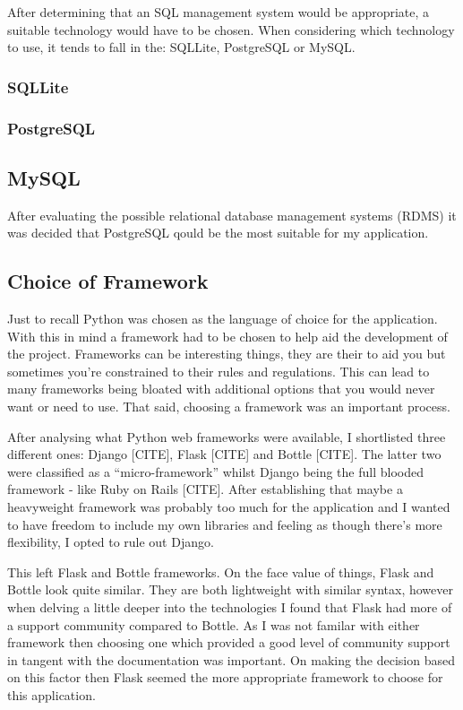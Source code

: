 After determining that an SQL management system would be appropriate, a suitable technology would have to be chosen. When considering which technology to use, it tends to fall in the: SQLLite, PostgreSQL or MySQL. 

\subsubsection{SQLLite}


\subsubsection{PostgreSQL}

\subsection{MySQL}


\begin{flushleft}
After evaluating the possible relational database management systems (RDMS) it was decided that PostgreSQL qould be the most suitable for my application. 
\end{flushleft}

\subsection{Choice of Framework}

Just to recall Python was chosen as the language of choice for the application. With this in mind a framework had to be chosen to help aid the development of the project. Frameworks can be interesting things, they are their to aid you but sometimes you're constrained to their rules and regulations. This can lead to many frameworks being bloated with additional options that you would never want or need to use. That said, choosing a framework was an important process. 

After analysing what Python web frameworks were available, I shortlisted three different ones: Django [CITE], Flask [CITE] and Bottle [CITE]. The latter two were classified as a  ``micro-framework'' whilst Django being the full blooded framework - like Ruby on Rails [CITE].  After establishing that maybe a heavyweight framework was probably too much for the application and I wanted to have freedom to include my own libraries and feeling as though there's more flexibility, I opted to rule out Django. 

This left Flask and Bottle frameworks. On the face value of things, Flask and Bottle look quite similar. They are both lightweight with similar syntax, however when delving a little deeper into the technologies I found that Flask had more of a support community compared to Bottle. As I was not familar with either framework then choosing one which provided a good level of community support in tangent with the documentation was important. On making the decision based on this factor then Flask seemed the more appropriate framework to choose for this application. 

